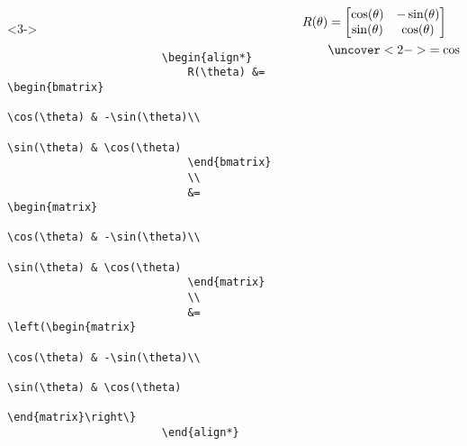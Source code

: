 \begin{frame}[fragile]
\begin{columns}
\begin{column}{0.5\textwidth}
\begin{adjustbox}{valign=T,set height=0pt,set depth=0.8\textheight,valign=B}
\begin{minipage}{0.9\textwidth}
\begin{onlyenv}
\begin{verbatim}
                    \end{verbatim}
                \end{onlyenv}%
                \begin{onlyenv}<3->
                    \begin{verbatim}
                        \begin{align*}
                            R(\theta) &= \begin{bmatrix}
                                \cos(\theta) & -\sin(\theta)\\
                                \sin(\theta) & \cos(\theta)
                            \end{bmatrix}
                            \\
                            &= \begin{matrix}
                                \cos(\theta) & -\sin(\theta)\\
                                \sin(\theta) & \cos(\theta)
                            \end{matrix}
                            \\
                            &= \left(\begin{matrix}
                                \cos(\theta) & -\sin(\theta)\\
                                \sin(\theta) & \cos(\theta)
                            \end{matrix}\right\}
                        \end{align*}
                    \end{verbatim}
                \end{onlyenv}            
                \end{minipage}
            \end{adjustbox}
        \end{column}
        \begin{column}{0.5\textwidth}
            \begin{align*}
                R(\theta) &= \begin{bmatrix}
                    \cos(\theta) & -\sin(\theta)\\
                    \sin(\theta) & \cos(\theta)
                \end{bmatrix}\\
                &\uncover<2->{= \begin{matrix}
                    \cos(\theta) & -\sin(\theta)\\

\end{matrix}}
\end{align*}
\end{column}
\end{columns}
\end{frame}
